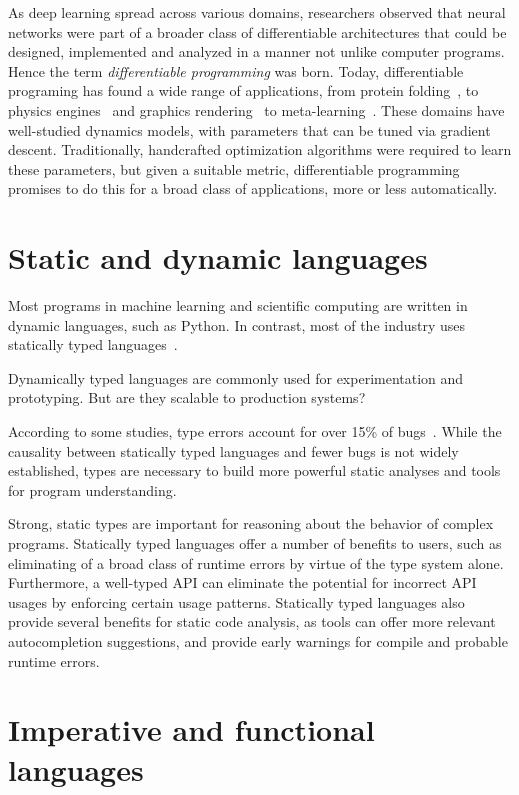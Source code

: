 \documentclass[12pt,initial,twoside,maitrise]{dms}
\numberwithin{equation}{section}
\numberwithin{table}{chapter}
\numberwithin{figure}{chapter}
\begin{document}
As deep learning spread across various domains, researchers observed that neural networks were part of a broader class of differentiable architectures that could be designed, implemented and analyzed in a manner not unlike computer programs. Hence the term \textit{differentiable programming} was born. Today, differentiable programing has found a wide range of applications, from protein folding~\cite{alquraishi2018end}, to physics engines~\cite{de2018end,DBLP:journals_corr_DegraveHDW16} and graphics rendering~\cite{loper2014opendr} to meta-learning~\cite{liu2018darts}. These domains have well-studied dynamics models, with parameters that can be tuned via gradient descent. Traditionally, handcrafted optimization algorithms were required to learn these parameters, but given a suitable metric, differentiable programming promises to do this for a broad class of applications, more or less automatically.

\section{Static and dynamic languages}

Most programs in machine learning and scientific computing are written in dynamic languages, such as Python. In contrast, most of the industry uses statically typed languages~\cite{github}.

Dynamically typed languages are commonly used for experimentation and prototyping. But are they scalable to production systems?

According to some studies, type errors account for over 15\% of bugs~\cite{gao2017type}. While the causality between statically typed languages and fewer bugs is not widely established, types are necessary to build more powerful static analyses and tools for program understanding.

Strong, static types are important for reasoning about the behavior of complex programs. Statically typed languages offer a number of benefits to users, such as eliminating of a broad class of runtime errors by virtue of the type system alone. Furthermore, a well-typed API can eliminate the potential for incorrect API usages by enforcing certain usage patterns. Statically typed languages also provide several benefits for static code analysis, as tools can offer more relevant autocompletion suggestions, and provide early warnings for compile and probable runtime errors.

\section{Imperative and functional languages}
\end{document}
